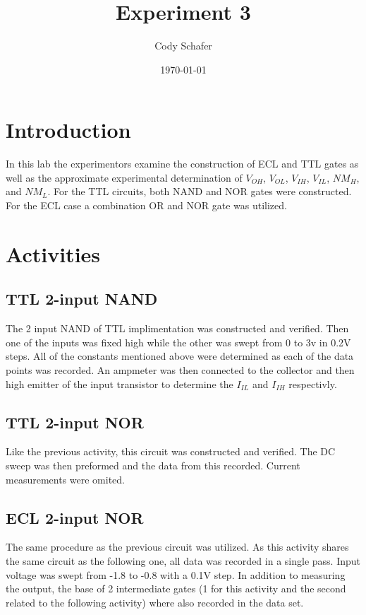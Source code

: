 \documentclass[10pt]{article}
\title{Experiment 3}
\author{Cody Schafer}
\date{\today}
\begin{document}
\maketitle
\section{Introduction}

In this lab the experimentors examine the construction of ECL and TTL
gates as well as the approximate experimental determination of $V_{OH}$,
$V_{OL}$, $V_{IH}$, $V_{IL}$, $NM_{H}$, and $NM_{L}$. For the TTL
circuits, both NAND and NOR gates were constructed. For the ECL case a
combination OR and NOR gate was utilized.

\section{Activities}

\subsection{TTL 2-input NAND}

The 2 input NAND of TTL implimentation was constructed and verified. Then
one of the inputs was fixed high while the other was swept from 0 to 3v in
0.2V steps. All of the constants mentioned above were determined as each
of the data points was recorded. An ampmeter was then connected to the
collector and then high emitter of the input transistor to determine the
$I_{IL}$ and $I_{IH}$ respectivly.

\subsection{TTL 2-input NOR}

Like the previous activity, this circuit was constructed and verified. The
DC sweep was then preformed and the data from this recorded. Current
measurements were omited.

\subsection{ECL 2-input NOR}

The same procedure as the previous circuit was utilized. As this activity
shares the same circuit as the following one, all data was recorded in a
single pass. Input voltage was swept from -1.8 to -0.8 with a 0.1V step.
In addition to measuring the output, the base of 2 intermediate gates (1
for this activity and the second related to the following activity)
where also recorded in the data set.
\end{document}
